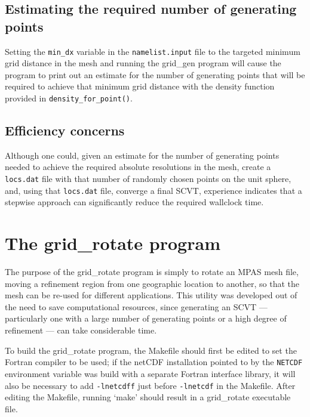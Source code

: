 \subsection{Estimating the required number of generating points}
\label{sec:estimating_np}

Setting the {\tt min\_dx} variable in the {\tt namelist.input} file to the targeted minimum grid distance in the mesh and running the grid\_gen program will cause the program to print out an estimate for the number of generating points that will be required to achieve that minimum grid distance with the density function provided in {\tt density\_for\_point()}.

\subsection{Efficiency concerns}
\label{sec:grid_gen_efficiency}

Although one could, given an estimate for the number of generating points needed to achieve the required absolute resolutions in the mesh,
create a {\tt locs.dat} file with that number of randomly chosen points on the unit sphere, and, using that {\tt locs.dat} file, converge a final SCVT, 
experience indicates that a stepwise approach can significantly reduce the required wallclock time.                   

   
\section{The grid\_rotate program} 
\label{sec:grid_rotate} 

The purpose of the grid\_rotate program is simply to rotate an MPAS mesh file, moving a refinement region from one geographic location to another, so that the mesh can be re-used for different applications. This utility was developed out of the need to save computational resources, since generating an SCVT --- particularly one with a large number of generating points or a high degree of refinement --- can take considerable time.

To build the grid\_rotate program, the Makefile should first be edited to set the Fortran compiler to be used; if the netCDF installation pointed to by the {\tt NETCDF} environment variable was build with a separate Fortran interface library, it will also be necessary to add {\tt -lnetcdff} just before {\tt -lnetcdf} in the Makefile. After editing the Makefile, running `make' should result in a grid\_rotate executable file.

